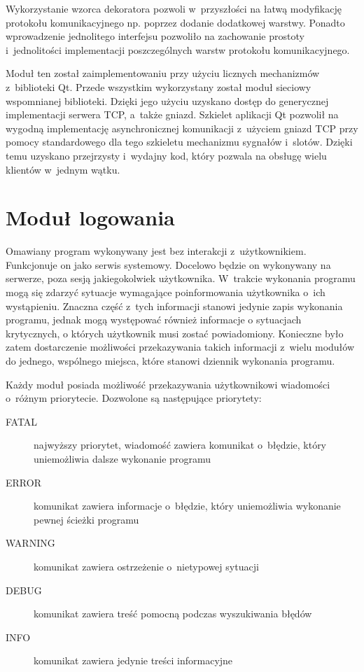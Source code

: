 
Wykorzystanie wzorca dekoratora pozwoli w~przyszłości na łatwą
modyfikację protokołu komunikacyjnego np. poprzez dodanie dodatkowej
warstwy. Ponadto wprowadzenie jednolitego interfejsu pozwoliło na
zachowanie prostoty i~jednolitości implementacji poszczególnych warstw
protokołu komunikacyjnego.

Moduł ten został zaimplementowaniu przy użyciu licznych mechanizmów
z~biblioteki Qt. Przede wszystkim wykorzystany został moduł sieciowy
wspomnianej biblioteki. Dzięki jego użyciu uzyskano dostęp do
generycznej implementacji serwera TCP, a~także gniazd. Szkielet
aplikacji Qt pozwolił na wygodną implementację asynchronicznej
komunikacji z~użyciem gniazd TCP przy pomocy standardowego dla tego
szkieletu mechanizmu sygnałów i~slotów. Dzięki temu uzyskano
przejrzysty i~wydajny kod, który pozwala na obsługę wielu klientów
w~jednym wątku.

\section[Moduł logowania][Moduł logowania]{Moduł logowania}

Omawiany program wykonywany jest bez interakcji
z~użytkownikiem. Funkcjonuje on jako serwis systemowy. Docelowo będzie
on wykonywany na serwerze, poza sesją jakiegokolwiek
użytkownika. W~trakcie wykonania programu mogą się zdarzyć sytuacje
wymagające poinformowania użytkownika o~ich wystąpieniu. Znaczna część
z~tych informacji stanowi jedynie zapis wykonania programu, jednak
mogą występować również informacje o sytuacjach krytycznych, o których
użytkownik musi zostać powiadomiony. Konieczne było zatem dostarczenie
możliwości przekazywania takich informacji z~wielu modułów do jednego,
wspólnego miejsca, które stanowi dziennik wykonania programu.

Każdy moduł posiada możliwość przekazywania użytkownikowi wiadomości
o~różnym priorytecie. Dozwolone są następujące priorytety:

\begin{description}
\item[FATAL] najwyższy priorytet, wiadomość zawiera komunikat
  o~błędzie, który uniemożliwia dalsze wykonanie programu
\item[ERROR] komunikat zawiera informacje o~błędzie, który
  uniemożliwia wykonanie pewnej ścieżki programu
\item[WARNING] komunikat zawiera ostrzeżenie o~nietypowej sytuacji
\item[DEBUG] komunikat zawiera treść pomocną podczas wyszukiwania błędów
\item[INFO] komunikat zawiera jedynie treści informacyjne
\end{description}

